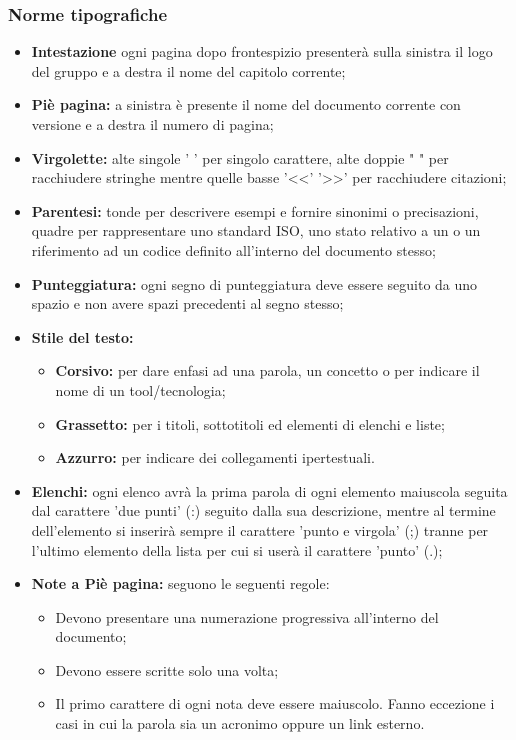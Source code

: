 \documentclass[NormeDiProgetto.tex]{subfiles}
\begin{document}
	\subsubsection{Norme tipografiche}
		\begin{itemize}
			\item \textbf{Intestazione} ogni pagina dopo frontespizio presenterà sulla sinistra il logo del gruppo e a destra il nome del capitolo corrente;
			
			\item \textbf{Piè pagina:} a sinistra è presente il nome del documento corrente con versione e a destra il numero di pagina; 
			
			\item \textbf{Virgolette:} alte singole ' ' per singolo carattere, alte doppie " " per racchiudere stringhe mentre quelle basse '\textless \textless ' '\textgreater \textgreater ' per racchiudere citazioni;
			 
			\item \textbf{Parentesi:} tonde per descrivere esempi e fornire sinonimi o precisazioni, quadre per rappresentare uno standard ISO, uno stato relativo a un  o un riferimento ad un codice definito all'interno del documento stesso;
			
			\item \textbf{Punteggiatura:} ogni segno di punteggiatura deve essere seguito da uno spazio e non avere spazi precedenti al segno stesso;

			\item \textbf{Stile del testo:} 
			\begin{itemize}
				\item \textbf{Corsivo:} per dare enfasi ad una parola, un concetto o per indicare il nome di un tool/tecnologia;
				\item \textbf{Grassetto:} per i titoli, sottotitoli ed elementi di elenchi e liste;
				\item \textbf{Azzurro:} per indicare dei collegamenti ipertestuali.
			\end{itemize}
		
			\item \textbf{Elenchi:} ogni elenco avrà la prima parola di ogni elemento maiuscola seguita dal carattere 'due punti' (:) seguito dalla sua descrizione, mentre al termine dell'elemento si inserirà sempre il carattere 'punto e virgola' (;) tranne per l'ultimo elemento della lista per cui si userà il carattere 'punto' (.);
			 
			\item \textbf{Note a Piè pagina:} seguono le seguenti regole: 
			\begin{itemize}
				\item Devono presentare una numerazione progressiva all'interno del documento;
				\item Devono essere scritte solo una volta;
				\item Il primo carattere di ogni nota deve essere maiuscolo. Fanno eccezione i casi in cui la parola sia un acronimo oppure un link esterno.
			\end{itemize}
			 

\end{itemize}
\end{document}
